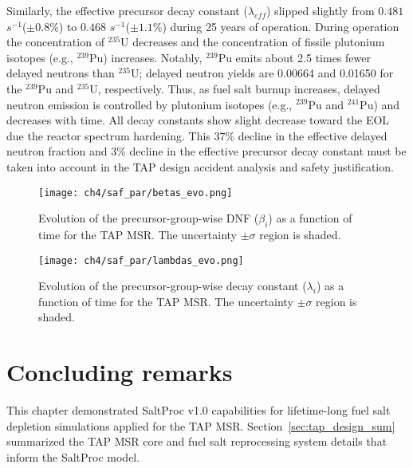 Similarly, the 
effective precursor decay constant ($\lambda_{eff}$) slipped slightly from 
$0.481$ $s^{-1}$($\pm0.8$\%) to $0.468$ $s^{-1}$($\pm1.1$\%) during 25 
years of operation. During operation the concentration of $^{235}$U decreases 
and the concentration of fissile plutonium isotopes (e.g., $^{239}$Pu) 
increases. Notably, $^{239}$Pu emits about 2.5 times fewer delayed neutrons 
than $^{235}$U; delayed neutron yields are 0.00664 and 0.01650 for the 
$^{239}$Pu and $^{235}$U, respectively. Thus, as fuel salt burnup increases, 
delayed neutron emission is controlled by plutonium isotopes (e.g., $^{239}$Pu 
and $^{241}$Pu) and decreases with time. All decay constants show slight 
decrease toward the \gls{EOL} due the reactor spectrum hardening. This 37\% 
decline in the effective delayed neutron fraction and 3\% decline in the 
effective precursor decay constant must be taken into account in the \gls{TAP} 
design accident analysis and safety justification.
\begin{figure}[htbp!] %
	\centering
	\texttt{[image: ch4/saf\_par/betas\_evo.png]}
		\vspace{-5mm}
	\caption{Evolution of the precursor-group-wise DNF ($\beta_i$) as a 
	function of time for the \gls{TAP} \gls{MSR}. The uncertainty $\pm\sigma$ 
	region is shaded.}
	\label{fig:beta-eol}
\end{figure}
\begin{figure}[hbbp!] %
	\centering
	\texttt{[image: ch4/saf\_par/lambdas\_evo.png]}
	\vspace{-5mm}
	\caption{Evolution of the precursor-group-wise decay constant 
	($\lambda_i$) as a function of time for the \gls{TAP} \gls{MSR}. The 
	uncertainty $\pm\sigma$ region is shaded.}
	\label{fig:lamda-eol}
\end{figure}
\newpage

\section{Concluding remarks}
This chapter demonstrated SaltProc v1.0 capabilities for lifetime-long fuel 
salt depletion simulations applied for the \gls{TAP} \gls{MSR}. 
Section~\ref{sec:tap_design_sum} summarized the \gls{TAP} \gls{MSR} core and 
fuel salt reprocessing system details that inform the SaltProc model.
 
